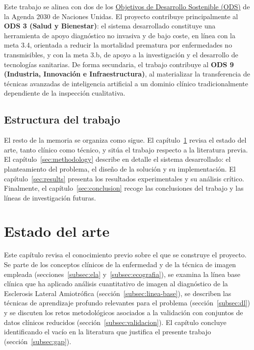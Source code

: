 \documentclass[12pt]{extarticle}
\numberwithin{equation}{section}
\begin{document}
\begin{refsection}
Este trabajo se alinea con dos de los \href{https://sdgs.un.org/es/goals}{Objetivos de Desarrollo Sostenible (ODS)} de la Agenda 2030 de Naciones Unidas. El proyecto contribuye principalmente al \textbf{ODS 3 (Salud y Bienestar)}: el sistema desarrollado constituye una herramienta de apoyo diagn\'ostico no invasiva y de bajo coste, en l\'inea con la meta 3.4, orientada a reducir la mortalidad prematura por enfermedades no transmisibles, y con la meta 3.b, de apoyo a la investigaci\'on y el desarrollo de tecnolog\'ias sanitarias. De forma secundaria, el trabajo contribuye al \textbf{ODS 9 (Industria, Innovaci\'on e Infraestructura)}, al materializar la transferencia de t\'ecnicas avanzadas de inteligencia artificial a un dominio cl\'inico tradicionalmente dependiente de la inspecci\'on cualitativa.

\subsection{Estructura del trabajo}

El resto de la memoria se organiza como sigue. El cap\'itulo~\ref{sec:related} revisa el estado del arte, tanto cl\'inico como t\'ecnico, y sit\'ua el trabajo respecto a la literatura previa. El cap\'itulo~\ref{sec:methodology} describe en detalle el sistema desarrollado: el planteamiento del problema, el dise\~no de la soluci\'on y su implementaci\'on. El cap\'itulo~\ref{sec:results} presenta los resultados experimentales y su an\'alisis cr\'itico. Finalmente, el cap\'itulo~\ref{sec:conclusion} recoge las conclusiones del trabajo y las l\'ineas de investigaci\'on futuras.

\newpage

\section{Estado del arte}\label{sec:related}

Este capítulo revisa el conocimiento previo sobre el que se construye el proyecto. Se parte de los conceptos clínicos de la enfermedad y de la técnica de imagen empleada (secciones~\ref{subsec:ela} y~\ref{subsec:ecografia}), se examina la línea base clínica que ha aplicado análisis cuantitativo de imagen al diagnóstico de la Esclerosis Lateral Amiotrófica (sección~\ref{subsec:linea-base}), se describen las técnicas de aprendizaje profundo relevantes para el problema (sección~\ref{subsec:dl}) y se discuten los retos metodológicos asociados a la validación con conjuntos de datos clínicos reducidos (sección~\ref{subsec:validacion}). El capítulo concluye identificando el vacío en la literatura que justifica el presente trabajo (sección~\ref{subsec:gap}).


\end{refsection}
\end{document}
